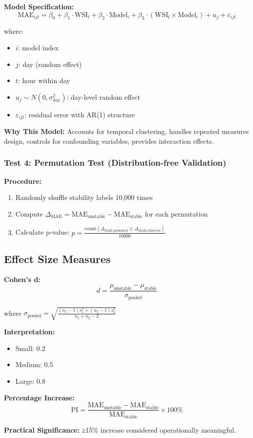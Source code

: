 \documentclass[11pt,a4paper]{article}
\begin{document}
\begin{mathbox}
\textbf{Model Specification:}
$$\text{MAE}_{ijt} = \beta_0 + \beta_1 \cdot \text{WSI}_t + \beta_2 \cdot \text{Model}_i + \beta_3 \cdot (\text{WSI}_t \times \text{Model}_i) + u_j + \varepsilon_{ijt}$$

where:
\begin{itemize}
    \item $i$: model index
    \item $j$: day (random effect)
    \item $t$: hour within day
    \item $u_j \sim N(0, \sigma^2_{\text{day}})$: day-level random effect
    \item $\varepsilon_{ijt}$: residual error with AR(1) structure
\end{itemize}
\end{mathbox}

\textbf{Why This Model:} Accounts for temporal clustering, handles repeated measures design, controls for confounding variables, provides interaction effects.

\subsubsection{Test 4: Permutation Test (Distribution-free Validation)}

\textbf{Procedure:}
\begin{enumerate}
    \item Randomly shuffle stability labels 10,000 times
    \item Compute $\Delta_{\text{MAE}} = \text{MAE}_{\text{unstable}} - \text{MAE}_{\text{stable}}$ for each permutation
    \item Calculate p-value: $p = \frac{\text{count}(\Delta_{\text{MAE,permuted}} \geq \Delta_{\text{MAE,observed}})}{10000}$
\end{enumerate}

\subsection{Effect Size Measures}

\begin{mathbox}
\textbf{Cohen's d:}
$$d = \frac{\mu_{\text{unstable}} - \mu_{\text{stable}}}{\sigma_{\text{pooled}}}$$

where $\sigma_{\text{pooled}} = \sqrt{\frac{(n_1-1)s_1^2 + (n_2-1)s_2^2}{n_1+n_2-2}}$

\textbf{Interpretation:}
\begin{itemize}
    \item Small: 0.2
    \item Medium: 0.5
    \item Large: 0.8
\end{itemize}

\textbf{Percentage Increase:}
$$\text{PI} = \frac{\text{MAE}_{\text{unstable}} - \text{MAE}_{\text{stable}}}{\text{MAE}_{\text{stable}}} \times 100\%$$

\textbf{Practical Significance:} ≥15\% increase considered operationally meaningful.
\end{mathbox}
\end{document}
